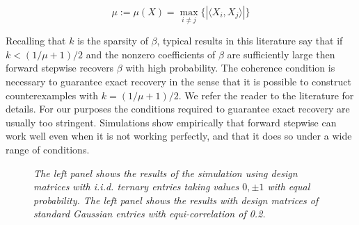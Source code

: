 \documentclass{imsart}
\newcommand{\innerp}[2]{\langle #1 , #2 \rangle}
\begin{document}
\begin{equation}
  \mu := \mu(X) = \max_{i \neq j} \{ | \innerp{ X_i }{ X_j } | \}
\end{equation}

Recalling that $k$ is the sparsity of $\beta$, typical results in this
literature say that if $k < (1/\mu + 1)/2$ and the nonzero
coefficients of $\beta$ are sufficiently large then forward stepwise
recovers $\beta$ with high probability. The coherence condition is
necessary to guarantee exact recovery \citep{cai:wang:xu:sharp} in the
sense that it is possible to construct counterexamples with
$k = (1/\mu + 1)/2$. We refer the reader to the literature for details.
For our purposes the
conditions required to guarantee exact recovery are usually too
stringent. Simulations show empirically that forward
stepwise can work well even when it is not working perfectly, and that
it does so under a wide range of conditions.


\begin{figure}
\begin{center}
\hspace{-15pt}
\caption{\small \it The left panel shows the results of the simulation
  using design matrices with i.i.d. ternary entries taking values $0,
  \pm 1$ with equal probability. The left panel shows the results
  with design matrices of standard Gaussian entries with
  equi-correlation of 0.2. }
\label{fig:fwdstepsim}
\end{center}
\end{figure}
\end{document}

